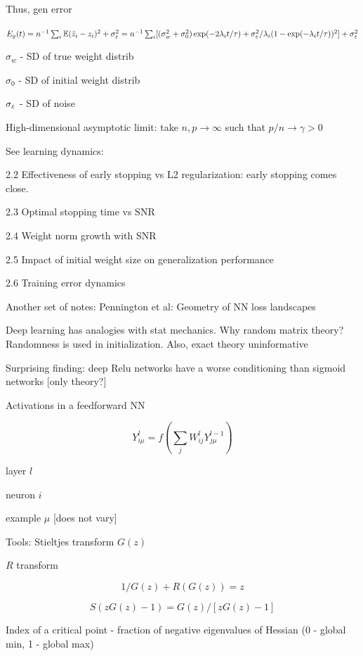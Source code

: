 \documentclass[english]{article}
\begin{document}
Thus, gen error

$E_g(t) = n^{-1}  \sum_i  \mathbb{E} (\bar z_i-z_i)^2+\sigma_\varepsilon^2 =  
n^{-1}  \sum_i  [(\sigma_w^2+\sigma_0^2)\exp(-2\lambda_i t/\tau)+\sigma_\varepsilon^2/\lambda_i(1- \exp(-\lambda_i t/\tau))^2]+\sigma_\varepsilon^2$

$\sigma_w$ - SD of true weight distrib

$\sigma_0$ - SD of initial weight distrib

$\sigma_\varepsilon$ - SD of noise

\item 
High-dimensional asymptotic limit: take $n,p \to \infty$ such that $p/n\to \gamma>0$

See learning dynamics: 

2.2 Effectiveness of early stopping vs L2 regularization: early stopping comes close.

2.3 Optimal stopping time vs SNR

2.4 Weight norm growth with SNR

2.5 Impact of initial weight size on generalization performance

2.6 Training error dynamics
\eenum

Another set of notes: Pennington et al: Geometry of NN loss landscapes


\benum

\item Deep learning has analogies with stat mechanics. Why random matrix theory? Randomness is used in initialization. Also, exact theory uninformative


Surprising finding: deep Relu networks have a worse conditioning than sigmoid networks [only theory?]

\item Activations in a feedforward NN

$$Y_{i\mu}^l = f(\sum_j W_{ij}^l Y_{j\mu}^{l-1})$$

\benum
\item layer $l$

\item neuron $i$

\item example $\mu$ [does not vary]
\eenum
\item Tools: 
Stieltjes transform $G(z)$

$R$ transform

$$1/G(z) + R(G(z)) = z$$

$$S(zG(z)-1) = G(z)/[zG(z)-1]$$


\item Index of a critical point - fraction of negative eigenvalues of Hessian (0 - global min, 1 - global max)
\end{document}
